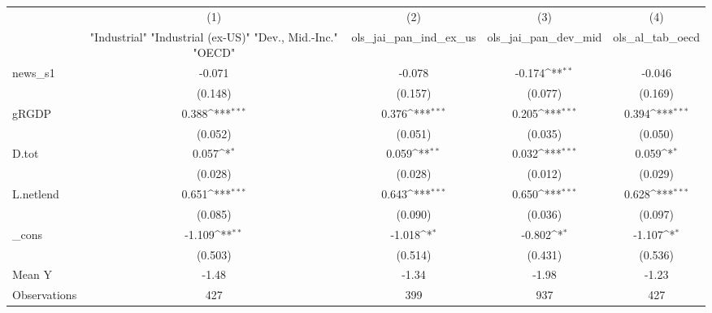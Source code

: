 {
\def\sym#1{\ifmmode^{#1}\else\(^{#1}\)\fi}
\begin{tabular}{l*{4}{c}}
\toprule
            &\multicolumn{1}{c}{(1)}&\multicolumn{1}{c}{(2)}&\multicolumn{1}{c}{(3)}&\multicolumn{1}{c}{(4)}\\
            &\multicolumn{1}{c}{ "Industrial" "Industrial (ex-US)" "Dev., Mid.-Inc." "OECD" }&\multicolumn{1}{c}{ols\_jai\_pan\_ind\_ex\_us}&\multicolumn{1}{c}{ols\_jai\_pan\_dev\_mid}&\multicolumn{1}{c}{ols\_al\_tab\_oecd}\\
\midrule
news\_s1     &      -0.071         &      -0.078         &      -0.174\sym{**} &      -0.046         \\
            &     (0.148)         &     (0.157)         &     (0.077)         &     (0.169)         \\
\addlinespace
gRGDP       &       0.388\sym{***}&       0.376\sym{***}&       0.205\sym{***}&       0.394\sym{***}\\
            &     (0.052)         &     (0.051)         &     (0.035)         &     (0.050)         \\
\addlinespace
D.tot       &       0.057\sym{*}  &       0.059\sym{**} &       0.032\sym{***}&       0.059\sym{*}  \\
            &     (0.028)         &     (0.028)         &     (0.012)         &     (0.029)         \\
\addlinespace
L.netlend   &       0.651\sym{***}&       0.643\sym{***}&       0.650\sym{***}&       0.628\sym{***}\\
            &     (0.085)         &     (0.090)         &     (0.036)         &     (0.097)         \\
\addlinespace
\_cons      &      -1.109\sym{**} &      -1.018\sym{*}  &      -0.802\sym{*}  &      -1.107\sym{*}  \\
            &     (0.503)         &     (0.514)         &     (0.431)         &     (0.536)         \\
\midrule
Mean Y      &       -1.48         &       -1.34         &       -1.98         &       -1.23         \\
Observations&         427         &         399         &         937         &         427         \\
\bottomrule
\end{tabular}
}
